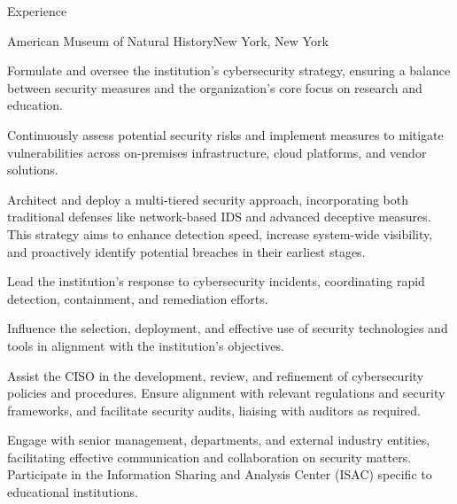 \documentclass[]{mcdowellcv}
\begin{document}
\makeheader

\begin{cvsection}{Experience}

    \begin{jobentry}{American Museum of Natural History}{New York, New York}
    \begin{jobpositions}
    \end{jobpositions}
        
        \begin{jobresponsibilities}
            \item Formulate and oversee the institution's cybersecurity strategy, ensuring a balance between security measures and the organization's core focus on research and education.
            \item Continuously assess potential security risks and implement measures to mitigate vulnerabilities across on-premises infrastructure, cloud platforms, and vendor solutions.
            \item Architect and deploy a multi-tiered security approach, incorporating both traditional defenses like network-based IDS and advanced deceptive measures. This strategy aims to enhance detection speed, increase system-wide visibility, and proactively identify potential breaches in their earliest stages.
            \item Lead the institution's response to cybersecurity incidents, coordinating rapid detection, containment, and remediation efforts.
            \item Influence the selection, deployment, and effective use of security technologies and tools in alignment with the institution's objectives.
            \item Assist the CISO in the development, review, and refinement of cybersecurity policies and procedures. Ensure alignment with relevant regulations and security frameworks, and facilitate security audits, liaising with auditors as required.
            \item Engage with senior management, departments, and external industry entities, facilitating effective communication and collaboration on security matters. Participate in the Information Sharing and Analysis Center (ISAC) specific to educational institutions.
        \end{jobresponsibilities}
        

\end{jobentry}
\end{cvsection}
\end{document}
